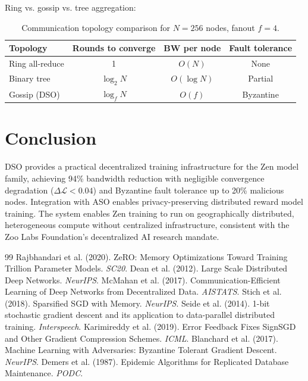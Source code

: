 \documentclass[11pt,a4paper]{article}
\begin{document}
Ring vs. gossip vs. tree aggregation:
\begin{table}[H]
\centering
\begin{tabular}{lccc}
\toprule
\textbf{Topology} & \textbf{Rounds to converge} & \textbf{BW per node} & \textbf{Fault tolerance} \\
\midrule
Ring all-reduce & 1 & $O(N)$ & None \\
Binary tree & $\log_2 N$ & $O(\log N)$ & Partial \\
Gossip (DSO) & $\log_f N$ & $O(f)$ & Byzantine \\
\bottomrule
\end{tabular}
\caption{Communication topology comparison for $N=256$ nodes, fanout $f=4$.}
\end{table}

\section{Conclusion}

DSO provides a practical decentralized training infrastructure for the Zen model family,
achieving 94\% bandwidth reduction with negligible convergence degradation ($\Delta\mathcal{L} < 0.04$)
and Byzantine fault tolerance up to 20\% malicious nodes. Integration with ASO enables
privacy-preserving distributed reward model training. The system enables Zen training
to run on geographically distributed, heterogeneous compute without centralized
infrastructure, consistent with the Zoo Labs Foundation's decentralized AI research mandate.


\begin{thebibliography}{99}
 Rajbhandari et al. (2020). ZeRO: Memory Optimizations Toward Training Trillion Parameter Models. \textit{SC20}.
 Dean et al. (2012). Large Scale Distributed Deep Networks. \textit{NeurIPS}.
 McMahan et al. (2017). Communication-Efficient Learning of Deep Networks from Decentralized Data. \textit{AISTATS}.
 Stich et al. (2018). Sparsified SGD with Memory. \textit{NeurIPS}.
 Seide et al. (2014). 1-bit stochastic gradient descent and its application to data-parallel distributed training. \textit{Interspeech}.
 Karimireddy et al. (2019). Error Feedback Fixes SignSGD and Other Gradient Compression Schemes. \textit{ICML}.
 Blanchard et al. (2017). Machine Learning with Adversaries: Byzantine Tolerant Gradient Descent. \textit{NeurIPS}.
 Demers et al. (1987). Epidemic Algorithms for Replicated Database Maintenance. \textit{PODC}.
\end{thebibliography}
\end{document}

